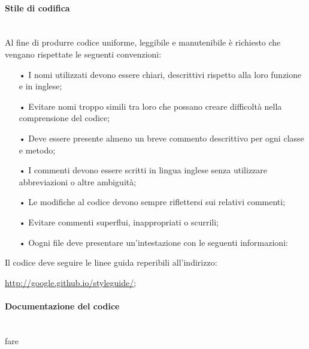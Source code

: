 \paragraph{Stile di codifica}\mbox{}\\
Al fine di produrre codice uniforme, leggibile e manutenibile è richiesto che vengano rispettate
le seguenti convenzioni:
\begin{itemize}
\item[•] I nomi utilizzati devono essere chiari, descrittivi rispetto alla loro funzione e in inglese;
\item[•] Evitare nomi troppo simili tra loro che possano creare difficoltà nella comprensione del codice;
\item[•] Deve essere presente almeno un breve commento descrittivo per ogni classe e metodo;
\item[•] I commenti devono essere scritti in lingua inglese senza utilizzare abbreviazioni o altre ambiguità;
\item[•] Le modifiche al codice devono sempre riflettersi sui relativi commenti;
\item[•] Evitare commenti superflui, inappropriati o scurrili;
\item[•] Oogni file deve presentare un’intestazione con le seguenti informazioni:
\end{itemize}
Il codice deve seguire le linee guida reperibili all’indirizzo:
\begin{center}
\url{http://google.github.io/styleguide/};
\end{center}
\paragraph{Documentazione del codice}\mbox{}\\
fare


